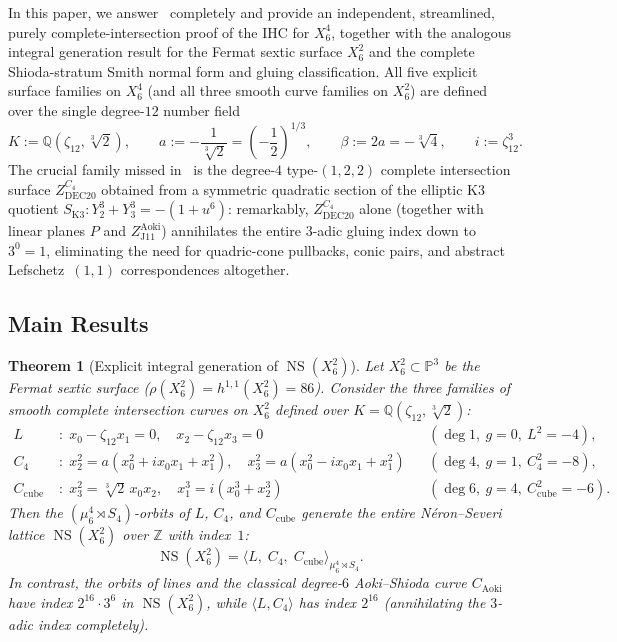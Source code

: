 \documentclass[11pt,a4paper]{amsart}
\newtheorem{theorem}{Theorem}[section]
\theoremstyle{definition}
\newcommand{\ZZ}{\mathbb{Z}}
\newcommand{\QQ}{\mathbb{Q}}
\newcommand{\PP}{\mathbb{P}}
\newcommand{\NS}{\operatorname{NS}}
\begin{document}
In this paper, we answer~\cite[Remark~8(1)]{SdJ26} completely and provide an independent, streamlined, purely complete-intersection proof of the IHC for $X_6^4$, together with the analogous integral generation result for the Fermat sextic surface $X_6^2$ and the complete Shioda-stratum Smith normal form and gluing classification.
All five explicit surface families on $X_6^4$ (and all three smooth curve families on $X_6^2$) are defined over the single degree-$12$ number field
\[
  K := \QQ(\zeta_{12}, \sqrt[3]{2}), \qquad a := -\frac{1}{\sqrt[3]{2}} = \left(-\frac{1}{2}\right)^{1/3}, \qquad \beta := 2a = -\sqrt[3]{4}, \qquad i := \zeta_{12}^3.
\]
The crucial family missed in~\cite{BFLGVL24, SdJ26} is the degree-$4$ type-$(1,2,2)$ complete intersection surface $Z_{\mathrm{DEC20}}^{C_4}$ obtained from a symmetric quadratic section of the elliptic K3 quotient $S_{\mathrm{K3}} : Y_2^3 + Y_3^3 = -(1+u^6)$: remarkably, $Z_{\mathrm{DEC20}}^{C_4}$ alone (together with linear planes $P$ and $Z_{\mathrm{J11}}^{\mathrm{Aoki}}$) annihilates the entire $3$-adic gluing index down to $3^0 = 1$, eliminating the need for quadric-cone pullbacks, conic pairs, and abstract Lefschetz~$(1,1)$ correspondences altogether.

\subsection{Main Results}

\begin{theorem}[Explicit integral generation of $\NS(X_6^2)$]\label{thm:A}
Let $X_6^2 \subset \PP^3$ be the Fermat sextic surface ($\rho(X_6^2) = h^{1,1}(X_6^2) = 86$). Consider the three families of smooth complete intersection curves on $X_6^2$ defined over $K = \QQ(\zeta_{12}, \sqrt[3]{2})$:
\begin{align*}
  L &\;:\; x_0 - \zeta_{12} x_1 = 0,\quad x_2 - \zeta_{12} x_3 = 0 && (\deg 1,\ g = 0,\ L^2 = -4), \\
  C_4 &\;:\; x_2^2 = a(x_0^2 + i x_0 x_1 + x_1^2),\quad x_3^2 = a(x_0^2 - i x_0 x_1 + x_1^2) && (\deg 4,\ g = 1,\ C_4^2 = -8), \\
  C_{\mathrm{cube}} &\;:\; x_3^2 = \sqrt[3]{2}\, x_0 x_2,\quad x_1^3 = i(x_0^3 + x_2^3) && (\deg 6,\ g = 4,\ C_{\mathrm{cube}}^2 = -6).
\end{align*}
Then the $(\mu_6^4 \rtimes S_4)$-orbits of $L$, $C_4$, and $C_{\mathrm{cube}}$ generate the entire N\'eron--Severi lattice $\NS(X_6^2)$ over $\ZZ$ with index~$1$:
\[
  \NS(X_6^2) = \langle L,\; C_4,\; C_{\mathrm{cube}} \rangle_{\mu_6^4 \rtimes S_4}.
\]
In contrast, the orbits of lines and the classical degree-$6$ Aoki--Shioda curve $C_{\mathrm{Aoki}}$~\cite{AS83,AS10} have index $2^{16}\cdot 3^6$ in $\NS(X_6^2)$, while $\langle L, C_4 \rangle$ has index $2^{16}$ (annihilating the $3$-adic index completely).
\end{theorem}
\end{document}
